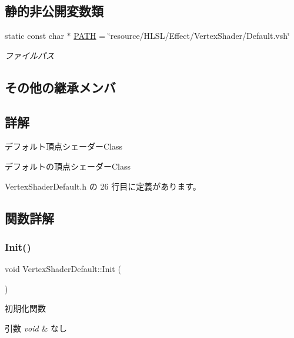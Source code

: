\subsection*{静的非公開変数類}
\begin{DoxyCompactItemize}
\item 
static const char $\ast$ \mbox{\hyperlink{class_vertex_shader_default_aa9890201467ac20a26bd518968474fc3}{P\+A\+TH}} = \char`\"{}resource/H\+L\+SL/Effect/Vertex\+Shader/Default.\+vsh\char`\"{}
\begin{DoxyCompactList}\small\item\em ファイルパス \end{DoxyCompactList}\end{DoxyCompactItemize}
\subsection*{その他の継承メンバ}


\subsection{詳解}
デフォルト頂点シェーダー\+Class 

デフォルトの頂点シェーダー\+Class 

 Vertex\+Shader\+Default.\+h の 26 行目に定義があります。



\subsection{関数詳解}
\mbox{\label{class_vertex_shader_default_afdf5dbbc83e9007fa85ed345e228d304}} 
\subsubsection{\texorpdfstring{Init()}{Init()}}
{\footnotesize\ttfamily void Vertex\+Shader\+Default\+::\+Init (\begin{DoxyParamCaption}{ }\end{DoxyParamCaption})\hspace{0.3cm}{\ttfamily [virtual]}}



初期化関数 


\begin{DoxyParams}{引数}
{\em void} & なし \\
\hline
\end{DoxyParams}

